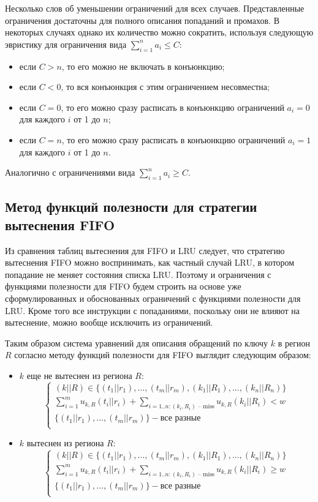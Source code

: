 \documentclass[14pt]{extreport}
\newcommand{\LRU}{\textsf{LRU}\xspace}
\newcommand{\FIFO}{\textsf{FIFO}\xspace}
\begin{document}
Несколько слов об уменьшении ограничений для всех случаев.
Представленные ограничения достаточны для полного описания
попаданий и промахов. В некоторых случаях однако их
количество можно сократить, используя следующую эвристику для ограничения вида $\sum_{i=1}^n a_i \leqslant C$:
\begin{itemize}
    \item если $C > n$, то его можно не включать в конъюнкцию;
    \item если $C < 0$, то вся конъюнкция с этим ограничением несовместна;
    \item если $C = 0$, то его можно сразу расписать в конъюнкцию ограничений $a_i = 0$ для каждого $i$ от 1 до $n$;
    \item если $C = n$, то его можно сразу расписать в конъюнкцию ограничений $a_i = 1$ для каждого $i$ от 1 до $n$.
\end{itemize}

Аналогично с ограничениями вида $\sum_{i=1}^n a_i \geqslant C$.


\subsection{Метод функций полезности для стратегии
вытеснения \FIFO}

Из сравнения таблиц вытеснения для \FIFO и \LRU следует, что
стратегию вытеснения \FIFO можно воспринимать, как частный случай
\LRU, в котором попадание не меняет состояния списка \LRU.
Поэтому и ограничения с функциями полезности для \FIFO будем строить
на основе уже сформулированных и обоснованных ограничений с
функциями полезности для \LRU. Кроме того все инструкции с
попаданиями, поскольку они не влияют на вытеснение, можно вообще
исключить из ограничений.

Таким образом система уравнений для описания обращений по ключу $k$ в регион $R$ согласно методу функций полезности для \FIFO выглядит следующим образом:
\begin{itemize}
\item $k$ еще не вытеснен из региона $R$:
$$
\left\{\begin{array}{l} (k||R) \in \{(t_1||r_1), ..., (t_m||r_m), (k_1||R_1), ..., (k_n||R_n)\}\\
\sum\limits_{i=1}^m u_{k,R}(t_i||r_i) + \sum\limits_{i=1..n:(k_i,R_i)\mbox{~-- miss}} u_{k,R}(k_i||R_i) < w\\
\{(t_1||r_1), ..., (t_m||r_m)\} - \mbox{все разные}\\
\end{array} \right.
$$
\item $k$ вытеснен из региона $R$:
$$
\left\{\begin{array}{l} (k||R) \in \{(t_1||r_1), ..., (t_m||r_m), (k_1||R_1), ..., (k_n||R_n)\}\\
\sum\limits_{i=1}^m u_{k,R}(t_i||r_i) + \sum\limits_{i=1..n:(k_i,R_i)\mbox{~-- miss}} u_{k,R}(k_i||R_i)
\geqslant w\\
\{(t_1||r_1), ..., (t_m||r_m)\} - \mbox{все разные}\\
\end{array} \right.
$$
\end{itemize}
\end{document}
